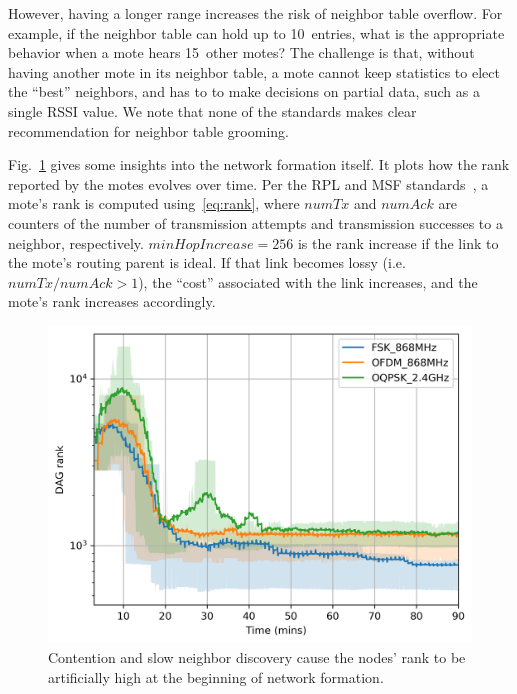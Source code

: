\documentclass[sensors,article,submit,moreauthors,pdftex]{Definitions/mdpi}
\newcommand{\figwidth}      {0.78}
\begin{document}

However, having a longer range increases the risk of neighbor table overflow.
For example, if the neighbor table can hold up to 10~entries, what is the appropriate behavior when a mote  hears 15~other motes?
The challenge is that, without having another mote in its neighbor table, a mote cannot keep statistics to elect the ``best'' neighbors, and has to to make decisions on partial data, such as a single RSSI value.
We note that none of the standards makes clear recommendation for neighbor table grooming.


Fig.~\ref{fig:dagrank_time} gives some insights into the network formation itself.
It plots how the rank reported by the motes evolves over time.
Per the RPL and MSF standards~\cite{rfc6550,draft-ietf-6tisch-msf}, a mote's rank is computed using~\eqref{eq:rank}, where $numTx$ and $numAck$ are counters of the number of transmission attempts and transmission successes to a neighbor, respectively.
$minHopIncrease = 256$ is the rank increase if the link to the mote's routing parent is ideal.
If that link becomes lossy (i.e.~$numTx/numAck>1$), the ``cost'' associated with the link increases, and the mote's rank increases accordingly.

\begin{figure}
	\centering
	\includegraphics[width=\figwidth\columnwidth]{dagrank_time}
    \caption{Contention and slow neighbor discovery cause the nodes' rank to be artificially high at the beginning of network formation.}
    \label{fig:dagrank_time}
\end{figure}
\end{document}
